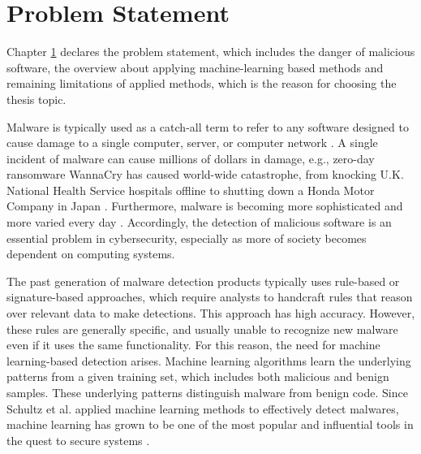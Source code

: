 
\chapter{Problem Statement}
\label{chap:problem-statement}
\graphicspath{{Chapter1/Figs/}}

\begin{chapabstract}
Chapter \ref{chap:problem-statement} declares the problem statement, which includes the danger of malicious software, the overview about applying machine-learning based methods and remaining limitations of applied methods, which is the reason for choosing the thesis topic.
\end{chapabstract}
 
 Malware is typically used as a catch-all term to refer to any software designed to cause damage to a single computer, server, or computer network \cite{moir2003defining}.
 A single incident of malware can cause millions of dollars in damage, e.g., zero-day ransomware WannaCry has caused world-wide catastrophe, from knocking U.K. National Health Service hospitals offline to shutting down a Honda Motor Company in Japan \cite{chen2017automated}.
 Furthermore, malware is becoming more sophisticated and more varied every day \cite{shahi2009technology}.
Accordingly, the detection of malicious software is an essential problem in cybersecurity, especially as more of society becomes dependent on computing systems.

The past generation of malware detection products typically uses rule-based or signature-based approaches, which require analysts to handcraft rules that reason over relevant data to make detections. 
This approach has high accuracy. 
However, these rules are generally specific, and usually unable to recognize new malware even if it uses the same functionality. 
For this reason, the need for machine learning-based detection arises. 
Machine learning algorithms learn the underlying patterns from a given training set, which includes both malicious and benign samples. 
These underlying patterns distinguish malware from benign code. 
Since Schultz et al. \cite{schultz2001data} applied machine learning methods to effectively detect malwares, machine learning has grown to be one of the most popular and influential tools in the quest to secure systems \cite{kolter2006learning,Shafiq2009AFF,saxe2015deep}. 

